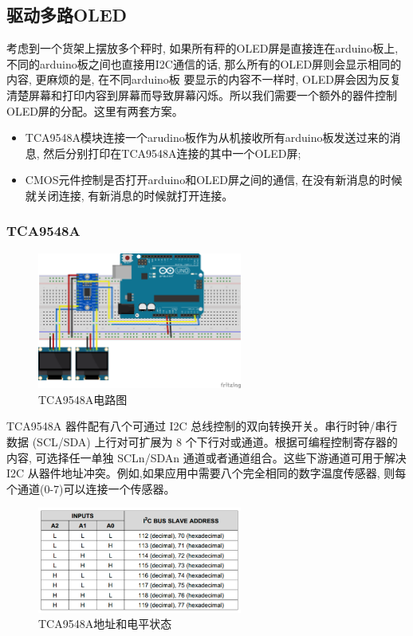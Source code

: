 \documentclass{article}
\begin{document}
\subsection{驱动多路OLED}
考虑到一个货架上摆放多个秤时, 如果所有秤的OLED屏是直接连在arduino板上, 不同的arduino板之间也直接用I2C通信的话, 那么所有的OLED屏则会显示相同的内容, 更麻烦的是, 在不同arduino板
要显示的内容不一样时, OLED屏会因为反复清楚屏幕和打印内容到屏幕而导致屏幕闪烁。所以我们需要一个额外的器件控制OLED屏的分配。这里有两套方案。
\begin{itemize}
  \item TCA9548A模块连接一个arudino板作为从机接收所有arduino板发送过来的消息, 然后分别打印在TCA9548A连接的其中一个OLED屏;
  \item CMOS元件控制是否打开arduino和OLED屏之间的通信, 在没有新消息的时候就关闭连接, 有新消息的时候就打开连接。
\end{itemize}

\subsubsection{TCA9548A}
\begin{figure}[h]
  \centering
  \includegraphics[width=0.6\textwidth]{../4_Chapter4_COMMUNICATION/Picture/TCA9548A.png}
  \caption{TCA9548A电路图}
  \label{fig:TCA9548A电路图}
\end{figure}

TCA9548A 器件配有八个可通过 I2C 总线控制的双向转换开关。串行时钟/串行数据 (SCL/SDA) 上行对可扩展为 8 个下行对或通道。根据可编程控制寄存器的内容,
可选择任一单独 SCLn/SDAn 通道或者通道组合。这些下游通道可用于解决 I2C 从器件地址冲突。例如,如果应用中需要八个完全相同的数字温度传感器,
则每个通道(0-7)可以连接一个传感器。

\begin{figure}[h]
  \centering
  \includegraphics[width=0.6\textwidth]{../4_Chapter4_COMMUNICATION/Picture/tcai2c.png}
  \caption{TCA9548A地址和电平状态}
  \label{fig:TCA9548A地址和电平状态}
\end{figure}
\end{document}
